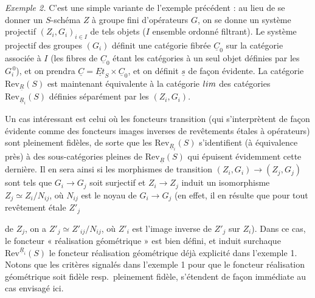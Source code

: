 \documentclass[11pt,a4paper]{article}
\begin{document}
\emph{Exemple 2.} C'est une simple variante de l'exemple précédent : au lieu de
se donner un $S$-schéma $Z$ à groupe fini d'opérateurs $G$, on se donne un
système projectif $(Z_i, G_i)_{i \in I}$ de tels objets ($I$ ensemble ordonné
filtrant).  Le système projectif des
groupes $(G_i)$ définit une catégorie fibrée $\underline{C}_0$ sur la catégorie
associée à $I$ (les fibres de $\underline{C}_0$ étant les catégories à un seul
objet définies par les $G_i^{\,0}$), et on prendra $\underline{C} =
\underline{Et}_S \times \underline{C}_0$, et on définit $\underline{s}$ de façon
évidente. La catégorie $\mathrm{Rev}_{\underline{R}}(S)$ est maintenant
équivalente à la catégorie $\varinjlim$ des catégories
$\mathrm{Rev}_{\underline{R}_i}(S)$ définies séparément par les $(Z_i, G_i)$.

Un cas intéressant est celui où les foncteurs transition (qui s'interprètent de
façon évidente comme des foncteurs images inverses de revêtements étales à
opérateurs) sont pleinement fidèles, de sorte que les
$\mathrm{Rev}_{\underline{R}_i}(S)$ s'identifient (à équivalence près) à des
sous-catégories pleines de $\mathrm{Rev}_{\underline{R}}(S)$ qui épuisent
évidemment cette dernière. Il en sera ainsi si les morphismes de transition
$(Z_i, G_i) \to (Z_j, G_j)$ sont tels que $G_i \to G_j$ soit surjectif et
$Z_i \to Z_j$ induit un isomorphisme $Z_j \simeq Z_i/N_{ij}$, où $N_{ij}$ est
le noyau de $G_i \to G_j$ (en effet, il en résulte que pour tout revêtement
étale $Z'_j$


de $Z_j$, on a $Z'_j \simeq Z'_{ij}/N_{ij}$, où $Z'_i$ est l'image inverse de
$Z'_j$ sur $Z_i$). Dans ce cas, le foncteur « réalisation géométrique » est
bien défini, et induit surchaque $\mathrm{Rev}^{\underline{R}_i}(S)$ le
foncteur réalisation géométrique déjà explicité dans l'exemple 1.
 Notons que les critères signalés dans
l'exemple 1 pour que le foncteur réalisation géométrique soit fidèle resp.\
pleinement fidèle, s'étendent de façon immédiate au cas envisagé ici.
\end{document}
